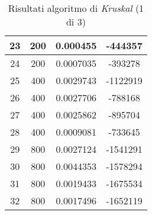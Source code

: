 \begin{table}[H]
\begin{tabular}{|c|c|c|c|}
		\hline
		23 & 200 & 0.000455 & -444357\\
		\hline
		24 & 200 & 0.0007035 & -393278\\
		\hline\hline
		25 & 400 & 0.0029743 & -1122919\\
		\hline
		26 & 400 & 0.0027706 & -788168\\
		\hline
		27 & 400 & 0.0025862 & -895704\\
		\hline
		28 & 400 & 0.0009081 & -733645\\
		\hline\hline
		29 & 800 & 0.0027124 & -1541291\\
		\hline
		30 & 800 & 0.0044353 & -1578294\\
		\hline
		31 & 800 & 0.0019433 & -1675534\\
		\hline
		32 & 800 & 0.0017496 & -1652119\\
		\hline
	\end{tabular}
\caption{Risultati algoritmo di \textit{Kruskal} (1 di 3)}
\end{table}
		
